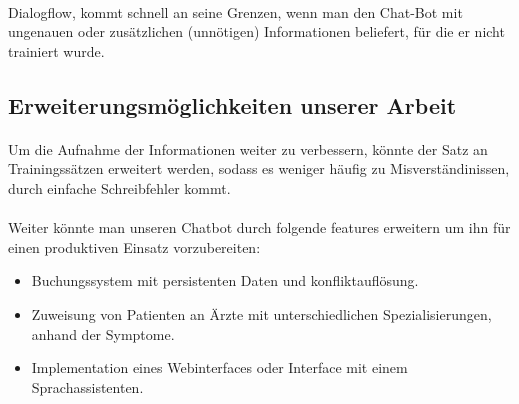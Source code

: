\documentclass[11pt,a4paper]{article}
\begin{document}
        \paragraph{}
            Dialogflow, kommt schnell an seine Grenzen, wenn man den Chat-Bot mit ungenauen oder zusätzlichen (unnötigen) Informationen beliefert,
            für die er nicht trainiert wurde. 
    \subsection{Erweiterungsmöglichkeiten unserer Arbeit}
        \paragraph{}
            Um die Aufnahme der Informationen weiter zu verbessern, könnte der Satz an Trainingssätzen erweitert werden, sodass es weniger häufig
            zu Misverständinissen, durch einfache Schreibfehler kommt.
        \paragraph{}
            Weiter könnte man unseren Chatbot durch folgende features erweitern um ihn für einen produktiven Einsatz vorzubereiten:
            \begin{itemize}
                \item Buchungssystem mit persistenten Daten und konfliktauflösung.
                \item Zuweisung von Patienten an Ärzte mit unterschiedlichen Spezialisierungen, anhand der Symptome.
                \item Implementation eines Webinterfaces oder Interface mit einem Sprachassistenten. 
            \end{itemize}
\end{document}
